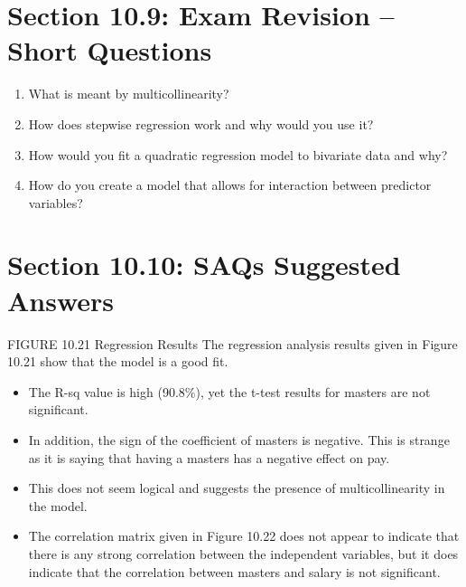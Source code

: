 \documentclass[]{report}
\begin{document}
\newpage
\section{Section 10.9: Exam Revision – Short Questions}
\begin{enumerate}
\item  What is meant by multicollinearity?
\item How does stepwise regression work and why would you use it?
\item How would you fit a quadratic regression model to bivariate data and why?
\item How do you create a model that allows for interaction between predictor variables?
\end{enumerate}


\section{Section 10.10: SAQs Suggested Answers}

FIGURE 10.21 Regression Results
The regression analysis results given in Figure 10.21 show that the model is a
good fit.

\begin{itemize}
	\item The R-sq value is high (90.8\%), yet the t-test results for masters are not
	significant. 
	\item In addition, the sign of the coefficient of masters is negative. This is
	strange as it is saying that having a masters has a negative effect on pay.
	\item  This
	does not seem logical and suggests the presence of multicollinearity in the model.
	\item The correlation matrix given in Figure 10.22 does not appear to indicate that
	there is any strong correlation between the independent variables, but it does
	indicate that the correlation between masters and salary is not significant.
\end{itemize}
\end{document}
